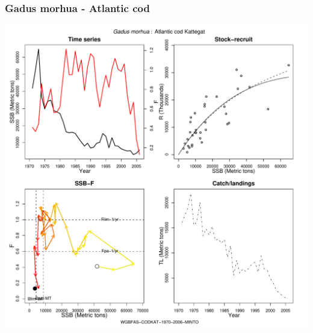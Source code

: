 \subsubsection{Gadus morhua - Atlantic cod}
\begin{center}
\includegraphics[width=1.2\textwidth]{../R/figures/WGBFAS-CODKAT-1970-2006-MINTO.pdf}
\end{center}

